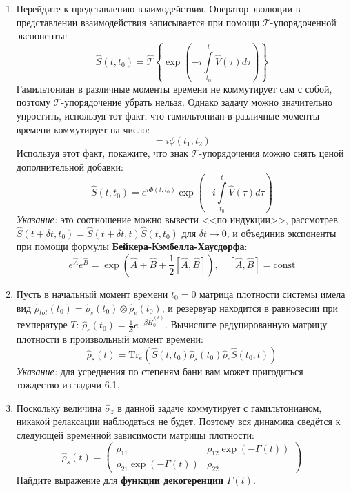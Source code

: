 \documentclass[12pt]{article}
\theoremstyle{definition}
\begin{document}
\begin{enumerate}
    \item Перейдите к представлению взаимодействия. Оператор эволюции в представлении взаимодействия записывается при помощи $\mathcal{T}$-упорядоченной экспоненты:
    \begin{equation}
        \hat{S}(t, t_0) = \hat{\mathcal{T}}\left\{\exp\left(-i\int\limits_{t_0}^t\hat{V}(\tau)d\tau\right)\right\}
    \end{equation}
    Гамильтониан в различные моменты времени не коммутирует сам с собой, поэтому $\mathcal{T}$-упорядочение убрать нельзя. Однако задачу можно значительно упростить, используя тот факт, что гамильтониан в различные моменты времени коммутирует на число:
    \begin{equation}
        [\hat{V}(t_1), \hat{V}(t_2)] = i\phi(t_1, t_2)
    \end{equation}
    Используя этот факт, покажите, что знак $\mathcal{T}$-упорядочения можно снять ценой дополнительной добавки:
    \begin{equation}
        \hat{S}(t,t_0) = e^{i\Phi(t,t_0)}\exp\left(-i\int\limits_{t_0}^t\hat{V}(\tau)d\tau\right)
    \end{equation}
    \textit{Указание:} это соотношение можно вывести <<по индукции>>, рассмотрев $\hat{S}(t + \delta t, t_0) = \hat{S}(t + \delta t, t)\hat{S}(t, t_0)$ для $\delta t \rightarrow 0$, и объединив экспоненты при помощи формулы \textbf{Бейкера-Кэмбелла-Хаусдорфа}:
    \begin{equation}
        e^{\hat{A}}e^{\hat{B}}=\exp\left(\hat{A}+\hat{B}+\frac{1}{2}[\hat{A},\hat{B}]\right),\quad[\hat{A},\hat{B}]=\text{const}
    \end{equation}
    \item Пусть в начальный момент времени $t_0 = 0$ матрица плотности системы имела вид $\hat{\rho}_{tot}(t_0) = \hat{\rho}_s(t_0)\otimes\hat{\rho}_e(t_0)$, и резервуар находится в равновесии при температуре $T$: $\hat{\rho}_e(t_0) = \frac{1}{Z}e^{-\beta\hat{H}^{(e)}_0}$. Вычислите редуцированную матрицу плотности в произвольный момент времени:
    \begin{equation}
        \hat{\rho}_s(t)=\text{Tr}_e(\hat{S}(t,t_0)\hat{\rho}_s(t_0)\hat{\rho}_e\hat{S}(t_0,t))
    \end{equation}
    \textit{Указание:} для усреднения по степеням бани вам может пригодиться тождество из задачи 6.1.
    \item Поскольку величина $\hat{\sigma}_z$ в данной задаче коммутирует с гамильтонианом, никакой релаксации наблюдаться не будет. Поэтому вся динамика сведётся к следующей временной зависимости матрицы плотности:
    \begin{equation}
        \hat{\rho}_s(t)=\begin{pmatrix}
        \rho_{11} & \rho_{12}\exp(-\Gamma(t))\\
        \rho_{21}\exp(-\Gamma(t)) & \rho_{22}
        \end{pmatrix}
    \end{equation}
    Найдите выражение для \textbf{функции декогеренции} $\Gamma(t)$.
\end{enumerate}
\end{document}

